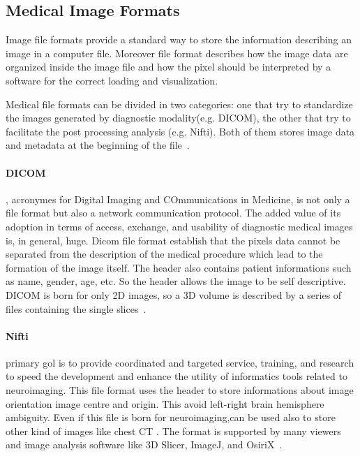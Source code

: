 \documentclass{standalone}
\begin{document}
	\subsection{Medical Image Formats}
	
	Image file formats provide a standard way to store the information describing an image in a computer file. Moreover file format  describes how the image data are organized inside the image file and how the pixel should be interpreted by a software for the correct loading and visualization.
	
	Medical file formats can be divided in two categories: one that try to standardize the images generated by diagnostic modality(e.g. DICOM), the other that try to facilitate the post processing analysis (e.g. Nifti). Both of them stores image data and metadata at the beginning of the file~\cite{ART:Larobina}. 
	
	\paragraph*{DICOM}, acronymes for Digital Imaging and COmmunications in Medicine, is not only a file format but also a network communication protocol. The added value of its adoption in terms of access, exchange, and usability of diagnostic medical images is, in general, huge.  Dicom file format establish that the pixels data cannot be separated from the description of the medical procedure which lead to the formation of the image itself. The header also contains patient informations such as name, gender, age, etc. So the header allows the image to be self descriptive. 
	DICOM is born for only 2D images, so a 3D volume is described by a series of files containing the single slices~\cite{ART:Larobina}. 
	
	\paragraph*{Nifti} primary gol is to provide coordinated and targeted service, training, and research to speed the development and enhance the utility of informatics tools related to neuroimaging. This file format uses the header to store informations about image orientation image centre and origin. This avoid left-right brain hemisphere ambiguity.  Even if this file is born for neuroimaging,can be used also to store other kind of images like chest CT . The format is supported by many viewers and image analysis software like 3D Slicer, ImageJ, and OsiriX~\cite{ART:Larobina}. 
	
	
\end{document}

